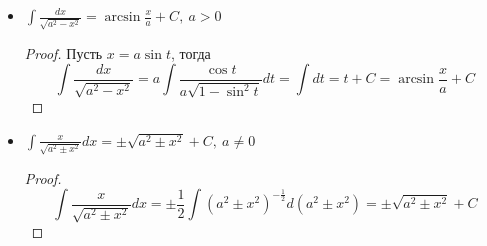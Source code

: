 \begin{itemize}
\begin{proof}
\begin{enumerate}
		\item Пусть $a > 0$, $x = k\tg t$.
		\begin{equation*}
		\int \frac{dx}{\sqrt{x^2 + k^2}} =
		\int \frac{dt}{\cos^2 t \cdot \sqrt{\tg^2 t + 1}} =
		\int \frac{dt}{\cos t} =
		\int \frac{d(\sin t)}{1 - \sin^2 t} =
		-\frac12 \ln \left| \frac{\sin t - 1}{\sin t + 1} \right| + C_1 =
		\end{equation*}
		\begin{equation*}
		= -\frac12 \ln \left| \frac{\sin^2 t - 1}{\sin^2 t + 1 + 2\sin t} \right| + C_1 =
		\end{equation*}
		\begin{equation*}
		\left| x = k\tg t \Rightarrow
		\sqrt{\frac1{\cos^2 t} - 1} = \frac{x}k \Rightarrow
		\cos^2 t = \frac{k^2}{x^2 + k^2} \Leftrightarrow
		\sin^2 t = \frac{x^2}{x^2 + k^2} \right|
		\end{equation*}
		\begin{equation*}
		= -\frac12 \ln \left| \frac{-\frac{k^2}{x^2 + k^2}}{\frac{2x^2 + k^2}{x^2 + k^2} + 2\sqrt{\frac{x^2}{x^2 + k^2}}} \right| + C_1 =
		\frac12 \ln \frac1{k^2} \left| 2x^2 + k^2 + 2x\sqrt{x^2 + k^2} \right| + C_1 =
		\end{equation*}
		\begin{equation*}
		= \frac12 \ln \left| x^2 + 2x\sqrt{x^2 + a} + (x^2 + a) \right| + C =
		\ln \left| x + \sqrt{x^2 + a} \right| + C
		\end{equation*}
	\end{enumerate}
	\end{proof}
	
	\item $\displaystyle \int \frac{dx}{\sqrt{a^2 - x^2}} = \arcsin \frac{x}a + C, \ a > 0$
	\begin{proof}
	Пусть $x = a \sin t$, тогда
	\begin{equation*}
	\int \frac{dx}{\sqrt{a^2 - x^2}} =
	a \int \frac{\cos t}{a \sqrt{1 - \sin^2 t}} dt =
	\int dt =
	t + C =
	\arcsin \frac{x}a + C
	\end{equation*}
	\end{proof}
	
	\item $\displaystyle \int \frac{x}{\sqrt{a^2 \pm x^2}} dx = \pm \sqrt{a^2 \pm x^2} + C, \ a \neq 0$
	\begin{proof}
	\begin{equation*}
	\int \frac{x}{\sqrt{a^2 \pm x^2}} dx =
	\pm \frac12 \int (a^2 \pm x^2)^{-\tfrac12} d(a^2 \pm x^2) =
	\pm \sqrt{a^2 \pm x^2} + C
	\end{equation*}
	\end{proof}
	

\end{itemize}

